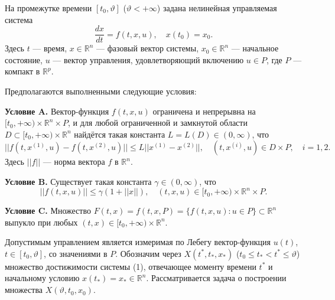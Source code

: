 \begin{abstract}
В докладе рассматривается задача о построении множеств достижимости нелинейных управляемых систем. Для решения этой задачи предлагается сеточный алгоритм, в котором совмещены процедуры вычисления следующего по времени множества достижимости и прореживания. Предложенный алгоритм позволяет более эффективно использовать ресурсы ЭВМ.

\end{abstract}


На промежутке времени $[t_0, \vartheta]$ ($\vartheta<+\infty$) задана нелинейная управляемая система
\begin{equation}\label{Izmest'evIV:eqn1}
\frac{dx}{dt}=f(t,x,u), \quad x(t_0)=x_0.	
\end{equation}
Здесь $t$ --- время, $x \in \mathbb{R}^n$ --- фазовый вектор системы, $x_0 \in \mathbb{R}^n$ --- начальное состояние, $u$ --- вектор управления, удовлетворяющий включению $u \in P$, где $P$ --- компакт в $\mathbb{R}^p$.

Предполагаются выполненными следующие условия:

\textbf{Условие A.} Вектор-функция $f(t,x,u)$ ограничена и непрерывна на $[t_0, +\infty) \times \mathbb{R}^n \times P$, и для любой ограниченной и замкнутой области $D \subset [t_0, +\infty) \times \mathbb{R}^n$ найдётся такая константа $L = L(D) \in (0,\infty)$, что
$$
||f(t,x^{(1)},u)-f(t,x^{(2)},u)|| \leq L||x^{(1)}-x^{(2)}||, \quad (t,x^{(i)}, u) \in D \times P,\quad i =1, 2.
$$
Здесь $||f||$ --- норма вектора $f$ в $\mathbb{R}^n$.

\textbf{Условие B.} Существует такая константа $\gamma\in (0, \infty)$, что
$$
||f(t,x,u)|| \leq \gamma(1+||x||), \quad (t,x,u) \in [t_0, +\infty) \times \mathbb{R}^n \times P.
$$

\textbf{Условие C.} Множество $F(t,x) = f(t,x,P) = \{f(t,x,u): u \in P\} \subset \mathbb{R}^n$ выпукло при любых $(t,x) \in [t_0, +\infty) \times \mathbb{R}^n$.

Допустимым управлением является измеримая по Лебегу вектор-функция $u(t)$, $t \in [t_0, \vartheta]$,  со значениями в $P$. Обозначим через $X(t^*,t_{*},x_*)$ ($t_0\leq t_{*} <t^*\leq \vartheta$) множество достижимости системы (1), отвечающее моменту времени $t^*$ и начальному условию $x(t_{*})=x_*\in \mathbb{R}^n$. Рассматривается задача о построении множества $X(\vartheta,t_{0},x_0)$.

